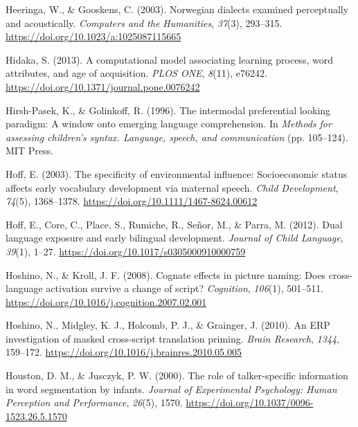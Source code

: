 \documentclass[
  12pt,
  b5paperpaper,
  twoside]{scrreprt}
\newlength{\cslhangindent}
\newlength{\cslentryspacingunit} %
\newenvironment{CSLReferences}[2] %
 {%
  \setlength{\parindent}{0pt}
  \ifodd #1
  \let\oldpar\par
  \def\par{\hangindent=\cslhangindent\oldpar}
  \fi
  \setlength{\parskip}{#2\cslentryspacingunit}
 }%
 {}
\begin{document}
\begin{CSLReferences}{1}{0}
\leavevmode{}%
Heeringa, W., \& Gooskens, C. (2003). Norwegian dialects examined
perceptually and acoustically. \emph{Computers and the Humanities},
\emph{37}(3), 293--315. \url{https://doi.org/10.1023/a:1025087115665}

\leavevmode{}%
Hidaka, S. (2013). A computational model associating learning process,
word attributes, and age of acquisition. \emph{PLOS ONE}, \emph{8}(11),
e76242. \url{https://doi.org/10.1371/journal.pone.0076242}

\leavevmode{}%
Hirsh-Pasek, K., \& Golinkoff, R. (1996). The intermodal preferential
looking paradigm: A window onto emerging language comprehension. In
\emph{Methods for assessing children's syntax. {Language}, speech, and
communication} (pp. 105--124). {MIT Press}.

\leavevmode{}%
Hoff, E. (2003). The specificity of environmental influence:
Socioeconomic status affects early vocabulary development via maternal
speech. \emph{Child Development}, \emph{74}(5), 1368--1378.
\url{https://doi.org/10.1111/1467-8624.00612}

\leavevmode{}%
Hoff, E., Core, C., Place, S., Rumiche, R., Señor, M., \& Parra, M.
(2012). Dual language exposure and early bilingual development.
\emph{Journal of Child Language}, \emph{39}(1), 1--27.
\url{https://doi.org/10.1017/s0305000910000759}

\leavevmode{}%
Hoshino, N., \& Kroll, J. F. (2008). Cognate effects in picture naming:
Does cross-language activation survive a change of script?
\emph{Cognition}, \emph{106}(1), 501--511.
\url{https://doi.org/10.1016/j.cognition.2007.02.001}

\leavevmode{}%
Hoshino, N., Midgley, K. J., Holcomb, P. J., \& Grainger, J. (2010). An
{ERP} investigation of masked cross-script translation priming.
\emph{Brain Research}, \emph{1344}, 159--172.
\url{https://doi.org/10.1016/j.brainres.2010.05.005}

\leavevmode{}%
Houston, D. M., \& Jusczyk, P. W. (2000). The role of talker-specific
information in word segmentation by infants. \emph{Journal of
Experimental Psychology: Human Perception and Performance},
\emph{26}(5), 1570. \url{https://doi.org/10.1037/0096-1523.26.5.1570}


\end{CSLReferences}
\end{document}
